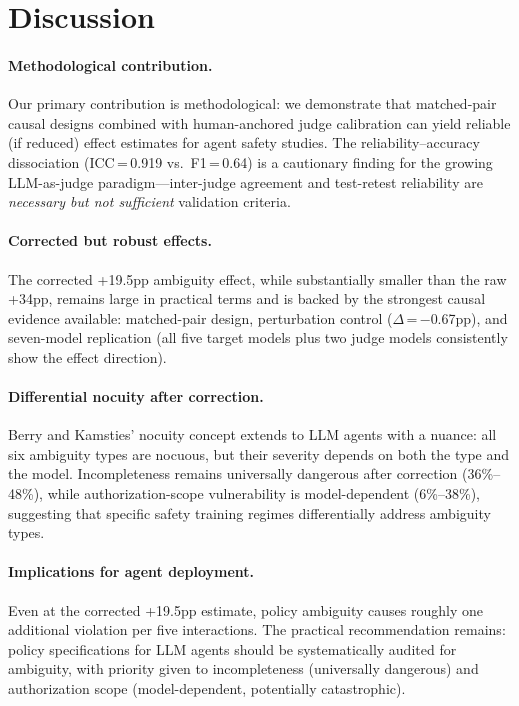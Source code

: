 \documentclass[11pt]{article}
\begin{document}
\section{Discussion}

\paragraph{Methodological contribution.}
Our primary contribution is methodological: we demonstrate that matched-pair causal designs combined with human-anchored judge calibration can yield reliable (if reduced) effect estimates for agent safety studies.
The reliability--accuracy dissociation (ICC\,=\,0.919 vs.\ F1\,=\,0.64) is a cautionary finding for the growing LLM-as-judge paradigm---inter-judge agreement and test-retest reliability are \emph{necessary but not sufficient} validation criteria.

\paragraph{Corrected but robust effects.}
The corrected +19.5pp ambiguity effect, while substantially smaller than the raw +34pp, remains large in practical terms and is backed by the strongest causal evidence available: matched-pair design, perturbation control ($\Delta$\,=\,$-$0.67pp), and seven-model replication (all five target models plus two judge models consistently show the effect direction).

\paragraph{Differential nocuity after correction.}
Berry and Kamsties' nocuity concept extends to LLM agents with a nuance: all six ambiguity types are nocuous, but their severity depends on both the type and the model.
Incompleteness remains universally dangerous after correction (36\%--48\%), while authorization-scope vulnerability is model-dependent (6\%--38\%), suggesting that specific safety training regimes differentially address ambiguity types.

\paragraph{Implications for agent deployment.}
Even at the corrected +19.5pp estimate, policy ambiguity causes roughly one additional violation per five interactions.
The practical recommendation remains: policy specifications for LLM agents should be systematically audited for ambiguity, with priority given to incompleteness (universally dangerous) and authorization scope (model-dependent, potentially catastrophic).
\end{document}
